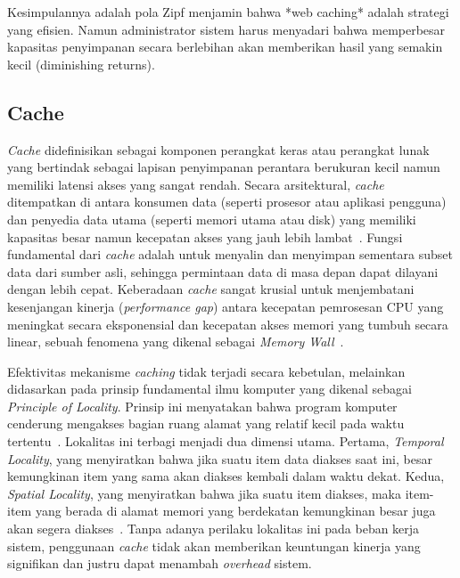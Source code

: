 Kesimpulannya adalah pola Zipf menjamin bahwa *web caching* adalah
strategi yang efisien. Namun administrator sistem harus menyadari
bahwa memperbesar kapasitas penyimpanan secara berlebihan akan
memberikan hasil yang semakin kecil (diminishing returns).

\subsection{Cache}

\textit{Cache} didefinisikan sebagai komponen perangkat keras atau
perangkat lunak yang bertindak sebagai lapisan penyimpanan perantara
berukuran kecil namun memiliki latensi akses yang sangat rendah.
Secara arsitektural, \textit{cache} ditempatkan di antara konsumen
data (seperti prosesor atau aplikasi pengguna) dan penyedia data
utama (seperti memori utama atau disk) yang memiliki kapasitas
besar namun kecepatan akses yang jauh lebih
lambat~\cite{Hennessy2011Computer}. Fungsi fundamental dari
\textit{cache} adalah untuk menyalin dan menyimpan sementara
subset data dari sumber asli, sehingga permintaan data di masa
depan dapat dilayani dengan lebih cepat. Keberadaan \textit{cache}
sangat krusial untuk menjembatani kesenjangan kinerja (\textit{performance gap})
antara kecepatan pemrosesan CPU yang meningkat secara eksponensial
dan kecepatan akses memori yang tumbuh secara linear, sebuah
fenomena yang dikenal sebagai \textit{Memory Wall}~\cite{Wulf1995Hitting}.

Efektivitas mekanisme \textit{caching} tidak terjadi secara kebetulan,
melainkan didasarkan pada prinsip fundamental ilmu komputer yang
dikenal sebagai \textit{Principle of Locality}. Prinsip ini menyatakan
bahwa program komputer cenderung mengakses bagian ruang alamat yang
relatif kecil pada waktu tertentu~\cite{Denning2005Locality}.
Lokalitas ini terbagi menjadi dua dimensi utama. Pertama,
\textit{Temporal Locality}, yang menyiratkan bahwa jika suatu item data
diakses saat ini, besar kemungkinan item yang sama akan diakses kembali
dalam waktu dekat. Kedua, \textit{Spatial Locality}, yang menyiratkan
bahwa jika suatu item diakses, maka item-item yang berada di alamat
memori yang berdekatan kemungkinan besar juga akan segera
diakses~\cite{Tanenbaum2014Modern}. Tanpa adanya perilaku lokalitas
ini pada beban kerja sistem, penggunaan \textit{cache} tidak akan
memberikan keuntungan kinerja yang signifikan dan justru dapat
menambah \textit{overhead} sistem.

